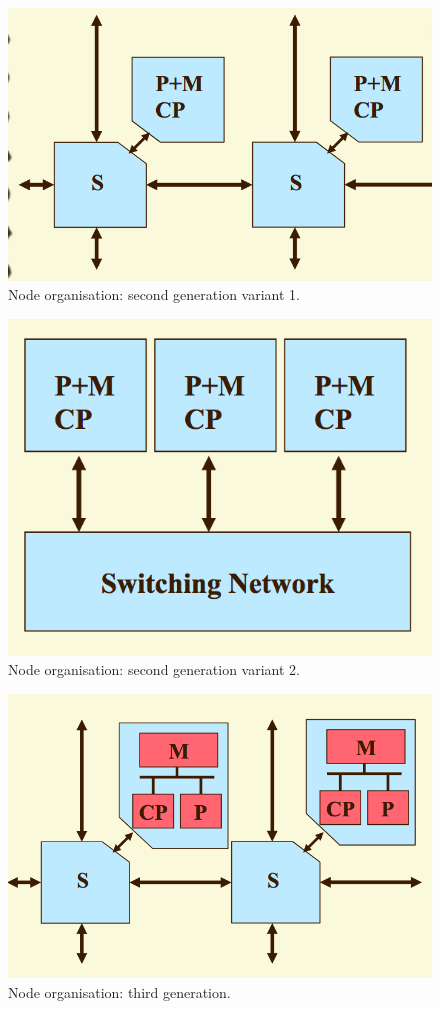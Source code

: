 \begin{figure}
\centering
\includegraphics[width=0.5\linewidth]{screenshot119}
\caption{Node organisation: second generation variant 1.}
\label{fig:screenshot119}
\end{figure}

\begin{figure}
\centering
\includegraphics[width=0.5\linewidth]{screenshot120}
\caption{Node organisation: second generation variant 2.}
\label{fig:screenshot120}
\end{figure}

\begin{figure}
\centering
\includegraphics[width=0.5\linewidth]{screenshot121}
\caption{Node organisation: third generation.}
\label{fig:screenshot121}
\end{figure}

